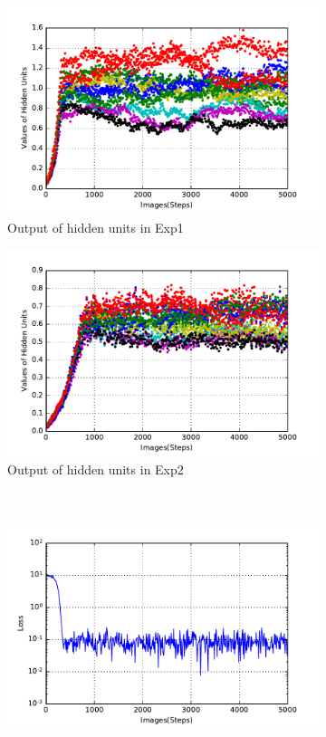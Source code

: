 \begin{figure}
\begin{subfigure}[t]{0.4\textwidth}
		\includegraphics[width=\textwidth]{pics_sdlm/31_exp_RBM_noise/exp1_hid_s.pdf}
		\caption{Output of hidden units in Exp1}
	\end{subfigure}
	\begin{subfigure}[t]{0.4\textwidth}
		\includegraphics[width=\textwidth]{pics_sdlm/31_exp_RBM_noise/exp2_hid_s.pdf}
		\caption{Output of hidden units in Exp2}
	\end{subfigure}\\
	\begin{subfigure}[t]{0.4\textwidth}
		\includegraphics[width=\textwidth]{pics_sdlm/31_exp_RBM_noise/exp1_loss_s.pdf}

\end{subfigure}
\end{figure}
